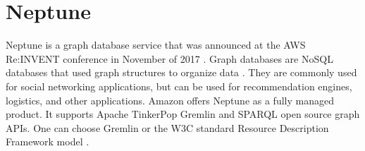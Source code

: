 \section{Neptune}

Neptune is a graph database  service that was
announced at the AWS Re:INVENT conference in November of
2017 \cite{hid-sp18-419-www-tc_neptune}. Graph databases are NoSQL
databases that used graph structures to organize data
\cite{hid-sp18-419-www-tp-graph-db}. They are commonly used for social
networking applications, but can be used for recommendation engines,
logistics, and other applications. Amazon  offers
Neptune as a fully managed product. It supports Apache TinkerPop
Gremlin and SPARQL  open
source graph APIs. One can choose Gremlin or the W3C 
standard Resource Description Framework model \cite{hid-sp18-419-www-aws-neptune}.
